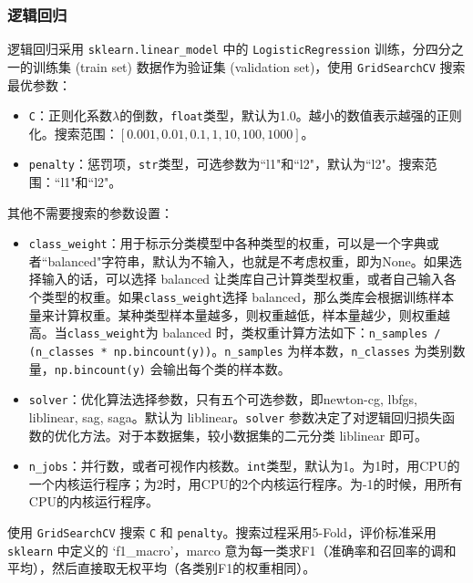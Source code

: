 \documentclass[a4paper]{article}
\begin{document}
\subsubsection{逻辑回归}
逻辑回归采用 \texttt{sklearn.linear\_model} 中的 \texttt{LogisticRegression} 训练，分四分之一的训练集 (train set) 数据作为验证集 (validation set)，使用 \texttt{GridSearchCV} 搜索最优参数：

\begin{itemize}
    \item \texttt{C}：正则化系数$\lambda$的倒数，\texttt{float}类型，默认为1.0。越小的数值表示越强的正则化。搜索范围：$[0.001, 0.01, 0.1, 1, 10, 100, 1000]$。
    \item \texttt{penalty}：惩罚项，\texttt{str}类型，可选参数为``l1"和``l2"，默认为``l2"。搜索范围：``l1"和``l2"。
\end{itemize}

\noindent 其他不需要搜索的参数设置：
\begin{itemize}
    \item \texttt{class\_weight}：用于标示分类模型中各种类型的权重，可以是一个字典或者``balanced"字符串，默认为不输入，也就是不考虑权重，即为None。如果选择输入的话，可以选择 balanced 让类库自己计算类型权重，或者自己输入各个类型的权重。如果\texttt{class\_weight}选择 balanced，那么类库会根据训练样本量来计算权重。某种类型样本量越多，则权重越低，样本量越少，则权重越高。当\texttt{class\_weight}为 balanced 时，类权重计算方法如下：\texttt{n\_samples / (n\_classes * np.bincount(y))}。\texttt{n\_samples} 为样本数，\texttt{n\_classes} 为类别数量，\texttt{np.bincount(y)} 会输出每个类的样本数。
    
    \item \texttt{solver}：优化算法选择参数，只有五个可选参数，即newton-cg, lbfgs, liblinear, sag, saga。默认为 liblinear。\texttt{solver} 参数决定了对逻辑回归损失函数的优化方法。对于本数据集，较小数据集的二元分类 liblinear 即可。
    
    \item \texttt{n\_jobs}：并行数，或者可视作内核数。\texttt{int}类型，默认为1。为1时，用CPU的一个内核运行程序；为2时，用CPU的2个内核运行程序。为-1的时候，用所有CPU的内核运行程序。
\end{itemize}

\noindent 使用 \texttt{GridSearchCV} 搜索 \texttt{C} 和 \texttt{penalty}。搜索过程采用5-Fold，评价标准采用 \texttt{sklearn} 中定义的 `f1\_macro'，marco 意为每一类求F1（准确率和召回率的调和平均），然后直接取无权平均（各类别F1的权重相同）。 
\end{document}
